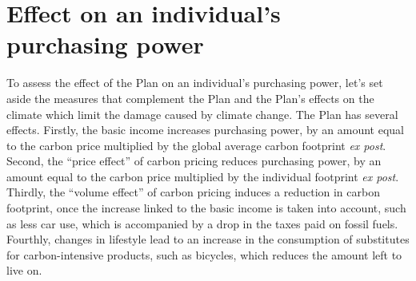 \documentclass[a5paper,english,openany]{memoir}
\begin{document}
\section*{Effect on an individual's purchasing power}\label{app:indiv}

To assess the effect of the Plan on an individual's purchasing power, let's set aside the measures that complement the Plan and the Plan's effects on the climate which limit the damage caused by climate change. %
The Plan has several effects. Firstly, the basic income increases purchasing power, by an amount equal to the carbon price multiplied by the global average carbon footprint \textit{ex post}. Second, the ``price effect'' of carbon pricing reduces purchasing power, by an amount equal to the carbon price multiplied by the individual footprint \textit{ex post}. Thirdly, the ``volume effect'' of carbon pricing induces a reduction in carbon footprint, once the increase linked to the basic income is taken into account, %
such as less car use, which is accompanied by a drop in the taxes paid on fossil fuels. Fourthly, changes in lifestyle lead to an increase in the consumption of substitutes for carbon-intensive products, such as bicycles, which reduces the amount left to live on. %
\end{document}
